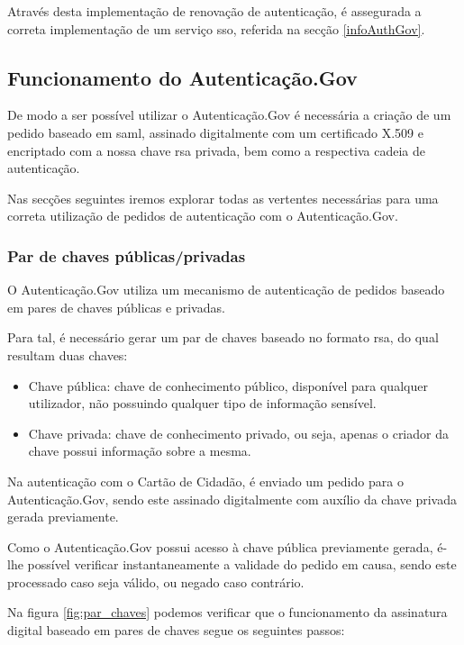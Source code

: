 Através desta implementação de renovação de autenticação, é assegurada a correta implementação de um serviço \gls{sso}, referida na secção \ref{infoAuthGov}.

\cleardoublepage
\subsection{Funcionamento do Autenticação.Gov}

De modo a ser possível utilizar o Autenticação.Gov é necessária a criação de um pedido baseado em \gls{saml}, assinado digitalmente com um certificado X.509 e encriptado com a nossa chave \gls{rsa} privada, bem como a respectiva cadeia de autenticação.

Nas secções seguintes iremos explorar todas as vertentes necessárias para uma correta utilização de pedidos de autenticação com o Autenticação.Gov.

\subsubsection{Par de chaves públicas/privadas}

O Autenticação.Gov utiliza um mecanismo de autenticação de pedidos baseado em pares de chaves públicas e privadas.

Para tal, é necessário gerar um par de chaves baseado no formato \gls{rsa}, do qual resultam duas chaves:
\begin{itemize}
    \item Chave pública: chave de conhecimento público, disponível para qualquer utilizador, não possuindo qualquer tipo de informação sensível.
    \item Chave privada: chave de conhecimento privado, ou seja, apenas o criador da chave possui informação sobre a mesma.
\end{itemize}

Na autenticação com o Cartão de Cidadão, é enviado um pedido para o Autenticação.Gov, sendo este assinado digitalmente com auxílio da chave privada gerada previamente.

Como o Autenticação.Gov possui acesso à chave pública previamente gerada, é-lhe possível verificar instantaneamente a validade do pedido em causa, sendo este processado caso seja válido, ou negado caso contrário.

Na figura \ref{fig:par_chaves} podemos verificar que o funcionamento da assinatura digital baseado em pares de chaves segue os seguintes passos:

